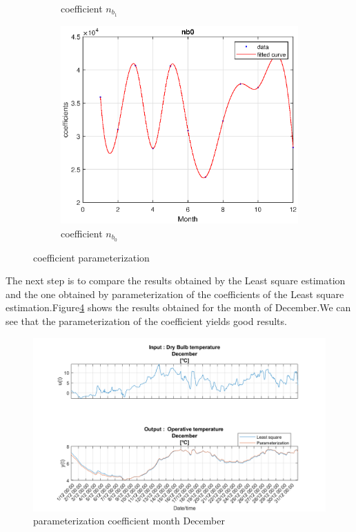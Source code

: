 \documentclass[a4paper,12pt]{article}
\numberwithin{equation}{section}
\begin{document}
\begin{figure}[H]
\begin{subfigure}{.5\textwidth}
  \caption{coefficient $n_{b_{1}}$}
  \label{fig:coeffnb1}
\end{subfigure}%
\begin{subfigure}{.5\textwidth}
  \centering
  \includegraphics[width=.7\linewidth]{coeffnb0.eps}
  \caption{coefficient $n_{b_{0}}$}
  \label{fig:coeffnb0}
\end{subfigure}
\caption{coefficient parameterization}
\label{fig:fitcurves}
\end{figure}


\noindent
The next step is to compare the results obtained by the Least square estimation and the one obtained by parameterization of the coefficients of the Least square estimation.Figure\ref{fig:valparG2} shows the results obtained for the month of December.We can see that the parameterization of the coefficient yields good results.

\begin{figure}[H]
    \includegraphics[width=\textwidth]{val_par_G2.png}
    \centering
    \caption{parameterization coefficient month December}
    \label{fig:valparG2}
\end{figure}
\end{document}
